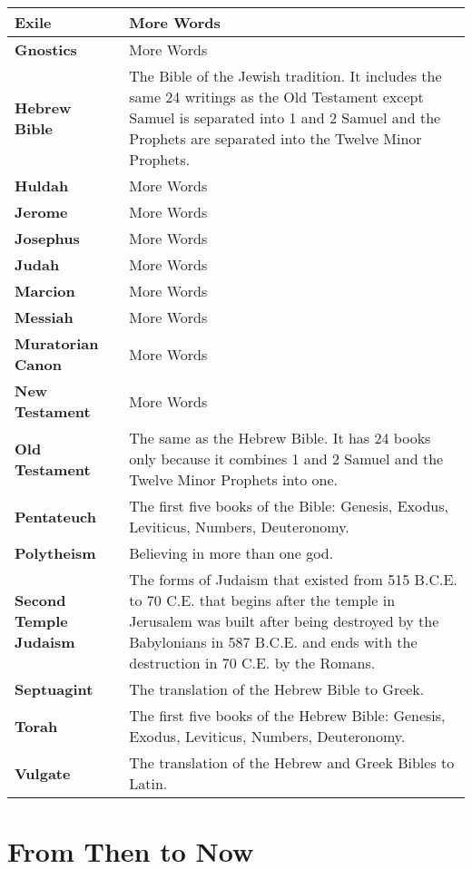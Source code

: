 \documentclass{report}
\begin{document}
\begin{center}
\begin{longtable}{| p{5cm} | p{7cm} |}
            \textbf{Exile} & More Words \\ \hline
            \textbf{Gnostics} & More Words \\ \hline
            \textbf{Hebrew Bible} & The Bible of the Jewish tradition. It includes the same 24 writings as the Old Testament except Samuel is separated into 1 and 2 Samuel and the Prophets are separated into the Twelve Minor Prophets.\\ \hline
            \textbf{Huldah} & More Words \\ \hline
            \textbf{Jerome} & More Words \\ \hline
            \textbf{Josephus} & More Words \\ \hline
            \textbf{Judah} & More Words \\ \hline
            \textbf{Marcion} & More Words \\ \hline
            \textbf{Messiah} & More Words \\ \hline
            \textbf{Muratorian Canon} & More Words \\ \hline
            \textbf{New Testament} & More Words \\ \hline
            \textbf{Old Testament} & The same as the Hebrew Bible. It has 24 books only because it combines 1 and 2 Samuel and the Twelve Minor Prophets into one.\\ \hline
            \textbf{Pentateuch} & The first five books of the Bible: Genesis, Exodus, Leviticus, Numbers, Deuteronomy.\\ \hline
            \textbf{Polytheism} & Believing in more than one god.\\ \hline
            \textbf{Second Temple Judaism} & The forms of Judaism that existed from 515 B.C.E. to 70 C.E. that begins after the temple in Jerusalem was built after being destroyed by the Babylonians in 587 B.C.E. and ends with the destruction in 70 C.E. by the Romans.\\ \hline
            \textbf{Septuagint} & The translation of the Hebrew Bible to Greek.\\ \hline
            \textbf{Torah} & The first five books of the Hebrew Bible: Genesis, Exodus, Leviticus, Numbers, Deuteronomy.\\ \hline
            \textbf{Vulgate} & The translation of the Hebrew and Greek Bibles to Latin.\\ \hline
        \end{longtable}
        \end{center}
    \chapter{From Then to Now}
\end{document}
